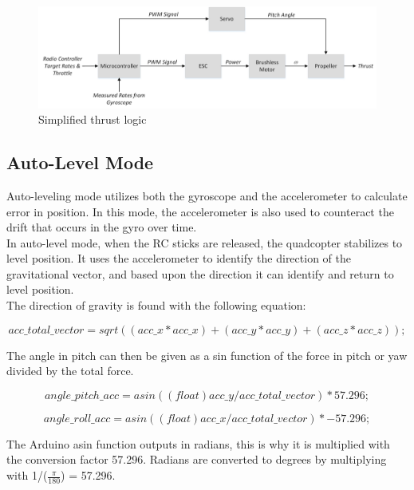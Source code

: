 \begin{figure}[H]
          \centering
            \includegraphics[scale = 0.45]{VAPIQ-PICTURES/simpleloop.jpg}
            \caption{Simplified thrust logic}
            \label{fig:simple}
\end{figure} 


\subsection{Auto-Level Mode}
Auto-leveling mode utilizes both the gyroscope and the accelerometer to calculate error in position. In this mode, the accelerometer is also used to counteract the drift that occurs in the gyro over time.
\\
In auto-level mode, when the RC sticks are released, the quadcopter stabilizes to level position. It uses the accelerometer to identify the direction of the gravitational vector, and based upon the direction it can identify and return to level position. 
\\
The direction of gravity is found with the following equation:

\begin{equation}
    acc\_total\_vector = sqrt((acc\_x*acc\_x)+(acc\_y*acc\_y)+(acc\_z*acc\_z)); 
\end{equation}

The angle in pitch can then be given as a sin function of the force in pitch or yaw divided by the total force. 

\begin{equation}
    angle\_pitch\_acc = asin((float)acc\_y/acc\_total\_vector)* 57.296;
\end{equation}

\begin{equation}
    angle\_roll\_acc = asin((float)acc\_x/acc\_total\_vector)* -57.296;
\end{equation}

The Arduino asin function outputs in radians, this is why it is multiplied with the conversion factor 57.296. Radians are converted to degrees by multiplying with 1/($\frac{\pi}{180}$) = 57.296. \bigskip 

